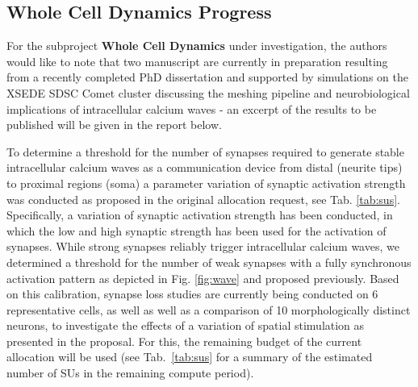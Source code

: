 \documentclass[10pt, letterpaper]{article}
\begin{document}

\subsection*{Whole Cell Dynamics Progress}
For the subproject \textbf{Whole Cell Dynamics} under investigation, the authors
would like to note that two manuscript are currently in preparation resulting from a 
recently completed PhD dissertation \cite{Grein2020} and supported by simulations on the XSEDE
SDSC Comet cluster discussing the meshing pipeline and neurobiological implications
of intracellular calcium waves - an excerpt of the results to be published will be
given in the report below.

To determine a threshold for the number of synapses required to generate stable 
intracellular calcium waves as a communication device from distal (neurite tips) 
to proximal regions (soma) a parameter variation of synaptic activation strength
was conducted as proposed in the original allocation request, see Tab. \ref{tab:sus}.
Specifically, a variation of synaptic activation strength has been conducted, in which
the low and high synaptic strength has been used for the activation of synapses.
While strong synapses reliably trigger intracellular calcium waves, we determined
a threshold for the number of weak synapses with a fully synchronous activation
pattern as depicted in Fig. \ref{fig:wave} and proposed previously. Based on this
calibration, synapse loss studies are currently being conducted on 6 representative 
cells, as well as well as a comparison of 10 morphologically distinct neurons,
to investigate the effects of a variation of spatial stimulation as presented in
the proposal. For this, the remaining budget of the current allocation
will be used (see Tab.~\ref{tab:sus} for a summary of the estimated number of
SUs in the remaining compute period).
\end{document}
